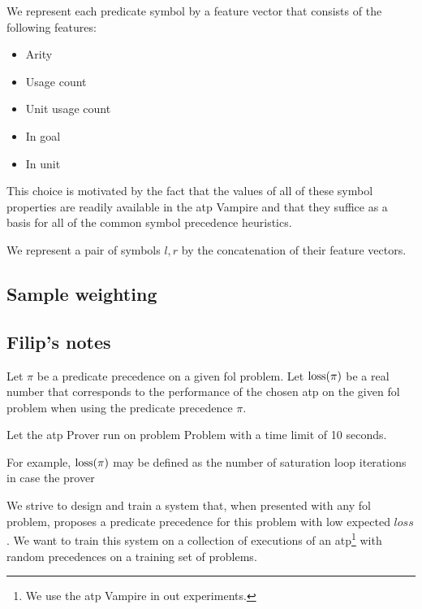 We represent each predicate symbol by a feature vector that consists of the following features:

\begin{itemize}
	\item Arity
	\item Usage count
	\item Unit usage count
	\item In goal
	\item In unit
\end{itemize}

This choice is motivated by the fact that the values of all of these symbol properties
are readily available in the \gls{atp} Vampire
and that they suffice as a basis for all of the common symbol precedence heuristics.

We represent a pair of symbols \(l, r\) by the concatenation of their feature vectors.

\subsection{Sample weighting}


\subsection{Filip's notes}

Let \(\pi\) be a predicate precedence on a given \gls{fol} problem.
Let \(\operatorname{loss}(\pi)\) be a real number that corresponds to the performance of the chosen \gls{atp}
on the given \gls{fol} problem when using the predicate precedence \(\pi\).

Let the \gls{atp} Prover run on problem Problem with a time limit of 10 seconds.


For example, \(\operatorname{loss}(\pi)\) may be defined as the number of saturation loop iterations in case the prover

We strive to design and train a system that, when presented with any \gls{fol} problem,
proposes a predicate precedence for this problem with low expected \(loss\).
We want to train this system on a collection of executions of an \gls{atp}\footnote{We use the \gls{atp} Vampire in out experiments.} with random precedences on a training set of problems.

